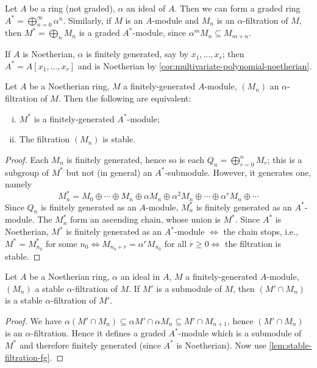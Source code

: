 Let $A$ be a ring (not graded), $\alpha$ an ideal of $A$. Then we can form a graded ring $A^* = \bigoplus_{n=0}^\infty \alpha^n$. Similarly, if $M$ is an $A$-module and $M_n$ is an $\alpha$-filtration of $M$, then $M^* = \bigoplus_n M_n$ is a graded $A^*$-module, since $\alpha^m M_n \subseteq M_{m+n}$.

If $A$ is Noetherian, $\alpha$ is finitely generated, say by $x_1, \ldots, x_r$; then $A^* = A[x_1, \ldots, x_r]$ and is Noetherian by \eqref{cor:multivariate-polynomial-noetherian}.

\begin{lemma}\label{lem:stable-filtration-fg}
    Let $A$ be a Noetherian ring, $M$ a finitely-generated $A$-module, $(M_n)$ an $\alpha$-filtration of $M$. Then the following are equivalent:
    \begin{enumerate}[i)]
        \item $M^*$ is a finitely-generated $A^*$-module;
        \item The filtration $(M_n)$ is stable.
    \end{enumerate}
\end{lemma}
\begin{proof}
    Each $M_n$ is finitely generated, hence so is each $Q_n = \bigoplus_{r=0}^n M_r$; this is a subgroup of $M^*$ but not (in general) an $A^*$-submodule. However, it generates one, namely
    \[
    M_n^* = M_0 \oplus \cdots \oplus M_n \oplus \alpha M_n \oplus \alpha^2 M_n \oplus \cdots \oplus \alpha^r M_n \oplus \cdots
    \]
    Since $Q_n$ is finitely generated as an $A$-module, $M_n^*$ is finitely generated as an $A^*$-module. The $M_n^*$ form an ascending chain, whose union is $M^*$. Since $A^*$ is Noetherian, $M^*$ is finitely generated as an $A^*$-module $\Leftrightarrow$ the chain stops, i.e., $M^* = M_{n_0}^*$ for some $n_0 \Leftrightarrow M_{n_0+r} = \alpha^r M_{n_0}$ for all $r \geq 0 \Leftrightarrow$ the filtration is stable. 
\end{proof}

\begin{proposition}\label{pro:artin-rees}
    Let $A$ be a Noetherian ring, $\alpha$ an ideal in $A$, $M$ a finitely-generated $A$-module, $(M_n)$ a stable $\alpha$-filtration of $M$. If $M'$ is a submodule of $M$, then $(M' \cap M_n)$ is a stable $\alpha$-filtration of $M'$.
\end{proposition}
\begin{proof}
    We have $\alpha(M' \cap M_n) \subseteq \alpha M' \cap \alpha M_n \subseteq M' \cap M_{n+1}$, hence $(M' \cap M_n)$ is an $\alpha$-filtration. Hence it defines a graded $A^*$-module which is a submodule of $M^*$ and therefore finitely generated (since $A^*$ is Noetherian). Now use \eqref{lem:stable-filtration-fg}.
\end{proof}

